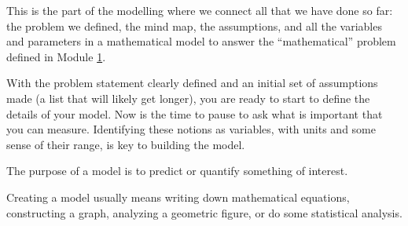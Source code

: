 



This is the part of the modelling where we connect all that we have done so far: the problem we defined, the mind map, the assumptions, and all the variables and parameters in a mathematical model to answer the ``mathematical'' problem defined in Module \hyperref[moddefine]{1}.


	

With the problem statement clearly defined and an initial set of assumptions made (a list that will likely get longer), you are ready to start to define the details of your model. Now is the time to pause to ask what is important that you can measure. 
Identifying these notions as variables, with units and some sense of their range, is key to building the model.

The purpose of a model is to predict or quantify something of interest. %
	
Creating a model usually means writing down mathematical equations, constructing a graph, analyzing a geometric figure, or do some statistical analysis. \\


